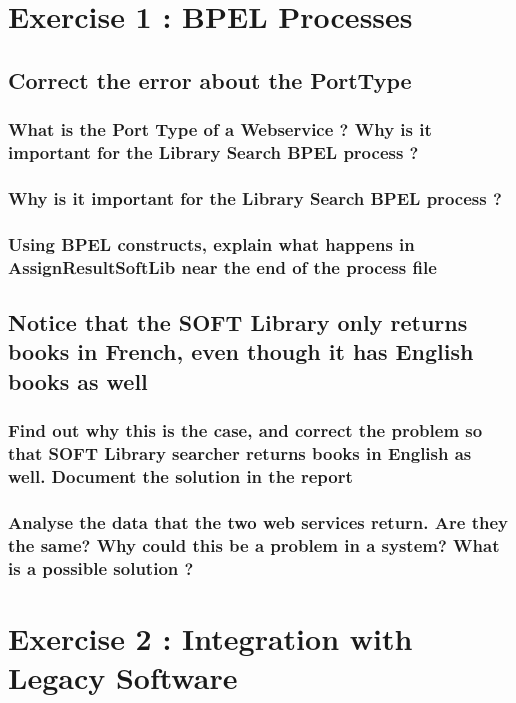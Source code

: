 \section{Exercise 1 : BPEL Processes}

\subsection{Correct the error about the PortType}
    \subsubsection{What is the Port Type of a Webservice ? Why is it important for the Library
    Search BPEL process ?}

    \subsubsection{Why is it important for the Library
    Search BPEL process ?}

    \subsubsection{Using BPEL constructs, explain what happens in AssignResultSoftLib near
    the end of the process file}

\subsection{Notice that the SOFT Library only returns books in French, even though it has English books as well}

\subsubsection{Find out why this is the case, and correct the problem so that SOFT Library searcher returns books in English as well. Document the solution in the
report}

\subsubsection{Analyse the data that the two web services return. Are they the same? Why
could this be a problem in a system? What is a possible solution ?}

\section{Exercise 2 : Integration with Legacy Software}

